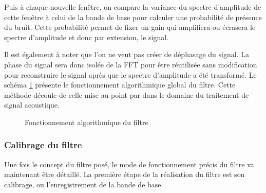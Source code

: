 \documentclass[letterpaper, twoside, 12pt, memoire, creativecommons, hyperref]{thETS}
\begin{document}
Puis à chaque nouvelle fenêtre, on compare la variance du spectre d'amplitude de cette fenêtre à celui de la bande de base pour calculer une probabilité de présence du bruit. Cette probabilité permet de fixer un gain qui amplifiera ou écrasera le spectre d'amplitude et donc par extension, le signal.

Il est également à noter que l'on ne veut pas créer de déphasage du signal. La phase du signal sera donc isolée de la FFT pour être réutilisée sans modification pour reconstruire le signal après que le spectre d'amplitude a été transformé. Le schéma \ref{fig:filtre} présente le fonctionnement algorithmique global du filtre. Cette méthode découle de celle mise au point par \cite{plapous2006} dans le domaine du traitement de signal acoustique.

\begin{figure}
	\centering
	\caption{Fonctionnement algorithmique du filtre}
	\label{fig:filtre}
\end{figure}

\subsubsection{Calibrage du filtre}

Une fois le concept du filtre posé, le mode de fonctionnement précis du filtre va maintenant être détaillé. La première étape de la réalisation du filtre est son calibrage, ou l'enregistrement de la bande de base. 
\end{document}
